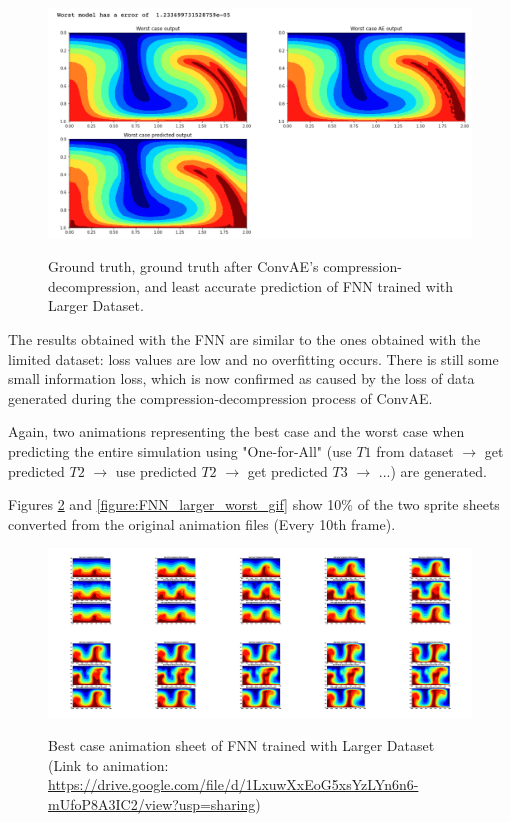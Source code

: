 \begin{figure}[H]
    \caption{Ground truth, ground truth after ConvAE's compression-decompression, and least accurate prediction of FNN trained with Larger Dataset.}
    \includegraphics[scale=0.5]{figures/mantle_convection_images/larger_dataset/FNN_Worst.png}
    \label{figure:FNN_larger_worst}
\end{figure}

The results obtained with the FNN are similar to the ones obtained with the limited dataset: loss values are low and no overfitting occurs. There is still some small information loss, which is now confirmed as caused by the loss of data generated during the compression-decompression process of ConvAE.

Again, two animations representing the best case and the worst case when predicting the entire simulation using "One-for-All" (use $T1$ from dataset $\rightarrow$ get predicted $T2$ $\rightarrow$ use predicted $T2$ $\rightarrow$ get predicted $T3$ $\rightarrow$ ...) are generated.

Figures \ref{figure:FNN_larger_best_gif} and \ref{figure:FNN_larger_worst_gif} show 10\% of the two sprite sheets converted from the original animation files (Every 10th frame).

\begin{figure}[H]
    \centering
    \caption{Best case animation sheet of FNN trained with Larger Dataset (Link to animation: \url{https://drive.google.com/file/d/1LxuwXxEoG5xsYzLYn6n6-mUfoP8A3IC2/view?usp=sharing})}
    \includegraphics[scale=0.10]{figures/mantle_convection_images/larger_dataset/FNN_Best_GIF_sheet.png}
    \label{figure:FNN_larger_best_gif}
\end{figure}


